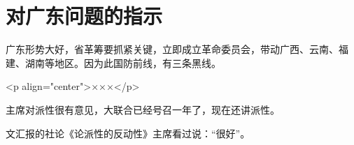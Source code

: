 \section[对广东问题的指示（一九六八年二月）]{对广东问题的指示}


广东形势大好，省革筹要抓紧关键，立即成立革命委员会，带动广西、云南、福建、湖南等地区。因为此国防前线，有三条黑线。

<p align="center">×××</p>

主席对派性很有意见，大联合已经号召一年了，现在还讲派性。

文汇报的社论《论派性的反动性》主席看过说：“很好”。



